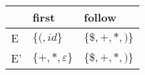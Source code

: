 \documentclass{standalone}
\providecommand\lightrule{%
	\arrayrulecolor{black!30}%
	\midrule[\lightrulewidth]%
	\arrayrulecolor{black}}
\begin{document}
\begin{tabularx}{\textwidth}{XXX}
    & first & follow \\
    \midrule
        E
        &
        \(\{(, id\}\)
        &
        \(\{\$, +, \ast, )\}\)
        \\ \lightrule
        E'
        &
        \(\{+,\ast, \varepsilon\}\)
        &
        \(\{\$, +, \ast, )\}\)
\end{tabularx}
\end{document}
